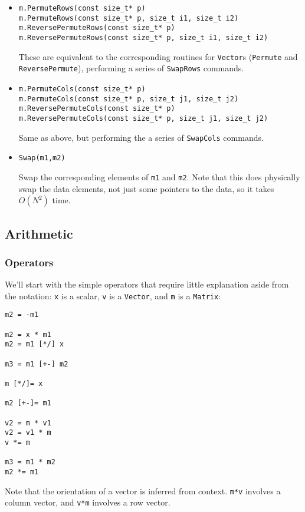 \documentclass[twoside,letterpaper,11pt]{article}
\renewcommand{\tt}[1]{{\texttt {#1}}}
\begin{document}
\begin{itemize}
\item
\begin{verbatim}
m.PermuteRows(const size_t* p)
m.PermuteRows(const size_t* p, size_t i1, size_t i2)
m.ReversePermuteRows(const size_t* p)
m.ReversePermuteRows(const size_t* p, size_t i1, size_t i2)
\end{verbatim}
These are equivalent to the corresponding routines for \tt{Vector}s 
(\tt{Permute} and \tt{ReversePermute}), performing a series of \tt{SwapRows} commands.

\item
\begin{verbatim}
m.PermuteCols(const size_t* p)
m.PermuteCols(const size_t* p, size_t j1, size_t j2)
m.ReversePermuteCols(const size_t* p)
m.ReversePermuteCols(const size_t* p, size_t j1, size_t j2)
\end{verbatim}
Same as above, but performing the a series of \tt{SwapCols} commands.

\item
\begin{verbatim}
Swap(m1,m2)
\end{verbatim}
Swap the corresponding elements of \tt{m1} and \tt{m2}.  Note that this does physically
swap the data elements, not just some pointers to the data, so it takes $O(N^2)$ time.

\end{itemize}

\subsection{Arithmetic}

\subsubsection{Operators}

We'll start with the simple operators that require little explanation aside from the 
notation: 
\tt{x} is a scalar, \tt{v} is a \tt{Vector}, and \tt{m} is a \tt{Matrix}:
\begin{verbatim}
m2 = -m1

m2 = x * m1
m2 = m1 [*/] x

m3 = m1 [+-] m2

m [*/]= x

m2 [+-]= m1

v2 = m * v1
v2 = v1 * m
v *= m

m3 = m1 * m2
m2 *= m1
\end{verbatim}
Note that the orientation of a vector is inferred from context.  \tt{m*v} involves a 
column vector, and \tt{v*m} involves a row vector.
\end{document}
